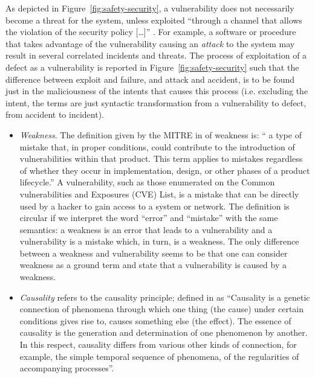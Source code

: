 \documentclass[conference]{IEEEtran}
\begin{document}
As depicted in Figure~\ref{fig:safety-security}, a vulnerability does not
necessarily become a threat for the system, unless exploited ``through a
channel that allows the violation of the security policy
[\ldots]'' \autocite{cnssi20104009}. For example, a software or procedure that takes
advantage of the vulnerability causing an \emph{attack} to the system may
result in several correlated incidents and threats.  The process of
exploitation of a defect as a vulnerability is reported in
Figure~\ref{fig:safety-security} such that the difference between exploit and failure,
and attack and accident, is to be found just in the maliciousness of the intents
that causes this process (i.e. excluding the intent, the terms are just syntactic transformation from a vulnerability to defect, from
accident to incident). 

\begin{itemize}
	\item \emph{Weakness}. The definition given by the MITRE in
		\autocite{MITRE2020CWEweakness} of weakness is: `` a type of
		mistake that, in proper conditions, could contribute to the
		introduction of vulnerabilities within that product. This term
		applies to mistakes regardless of whether they occur in
		implementation, design, or other phases of a product
		lifecycle.'' A vulnerability, such as those enumerated on the
		Common vulnerabilities and Exposures (CVE) List, is a mistake
		that can be directly used by a hacker to gain access to a
		system or network.  The definition is circular if we interpret
		the word ``error'' and ``mistake'' with the same semantics: a
		weakness is an error that leads to a vulnerability and a
		vulnerability is a mistake which, in turn, is a weakness. The
		only difference between a weakness and vulnerability seems to
		be that one can consider weakness as a ground term and state
		that a vulnerability is caused by a weakness.
	\item \emph{Causality} refers to the causality principle; defined
		in \autocite{Spirkin1983Dialectical} as ``Causality is a genetic
		connection of phenomena through which one thing (the cause)
		under certain conditions gives rise to, causes something else
		(the effect). The essence of causality is the generation and
		determination of one phenomenon by another. In this respect,
		causality differs from various other kinds of connection, for
		example, the simple temporal sequence of phenomena, of the
		regularities of accompanying processes''. 

\end{itemize}
\end{document}
